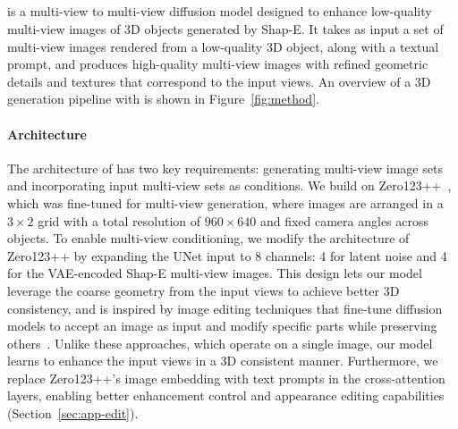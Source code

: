 \subsection{\ourname}
\ourname{} is a multi-view to multi-view diffusion model designed to enhance low-quality multi-view images of 3D objects generated by Shap-E. It takes as input a set of multi-view images rendered from a low-quality 3D object, along with a textual prompt, and produces high-quality multi-view images with refined geometric details and textures that correspond to the input views.
An overview of a 3D generation pipeline with \ourname{} is shown in Figure~\ref{fig:method}.

\paragraph{Architecture}
The architecture of \ourname{} has two key requirements: generating multi-view image sets and incorporating input multi-view sets as conditions. We build on Zero123++~\cite{shi2023zero123singleimageconsistent, xu2024instantmesh}, which was fine-tuned for multi-view generation, where images are arranged in a $3\times2$ grid with a total resolution of $960\times640$ and fixed camera angles across objects.
%
To enable multi-view conditioning, we modify the architecture of Zero123++ by expanding the UNet input to 8 channels: 4 for latent noise and 4 for the VAE-encoded Shap-E multi-view images. This design lets our model leverage the coarse geometry from the input views to achieve better 3D consistency, and is inspired by image editing techniques that fine-tune diffusion models to accept an image as input and modify specific parts while preserving others~\cite{brooks2022instructpix2pix, rombach2022highresolutionimagesynthesislatent, yang2022paint}. Unlike these approaches, which operate on a single image, our model learns to enhance the input views in a 3D consistent manner. 
Furthermore, we replace Zero123++'s image embedding with text prompts in the cross-attention layers, enabling better enhancement control and appearance editing capabilities (Section~\ref{sec:app-edit}).


